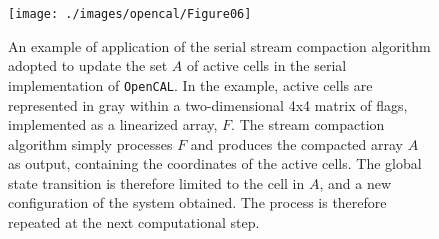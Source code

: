 \begin{figure}
	\begin{center}
		\texttt{[image: ./images/opencal/Figure06]}
		\caption[The adopted serial stream compaction algorithm.]{An example of application of the serial stream compaction algorithm
			adopted to update the set $A$ of active cells in the serial
			implementation of \texttt{OpenCAL}. In the example, active cells are
			represented in gray within a two-dimensional 4x4 matrix of flags,
			implemented as a linearized array, $F$. The stream compaction
			algorithm simply processes $F$ and produces the compacted array $A$ as
			output, containing the coordinates of the active cells. The global
			state transition is therefore limited to the cell in $A$, and a new
			configuration of the system obtained. The process is therefore
			repeated at the next computational step.}
		\label{fig:active_cells}
	\end{center}
\end{figure}

